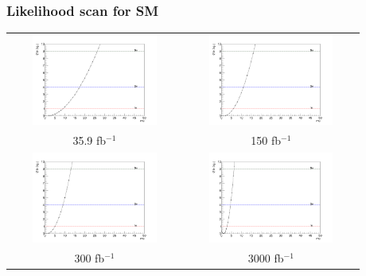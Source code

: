 \documentclass[11pt]{beamer}
\begin{document}
{\nologo
	\begin{frame}
	\frametitle{Likelihood scan for SM }
	\begin{center}
		\begin{tabular}{cc}
			\includegraphics[width=5.5cm,height=3cm]{figures/Likelihood.png} &
			\includegraphics[width=5.5cm,height=3cm]{figures/150fb/Likelihood.png}\\ 
			\scriptsize{35.9 fb$^{-1}$} & \scriptsize{150 fb$^{-1}$} \\
			\includegraphics[width=5.5cm,height=3cm]{figures/300fb/Likelihood.png}&
			\includegraphics[width=5.5cm,height=3cm]{figures/3000fb/Likelihood.png}\\
			\scriptsize{300 fb$^{-1}$} & \scriptsize{3000 fb$^{-1}$} \\
		\end{tabular}
	\end{center}
\end{frame}
}
\end{document}
